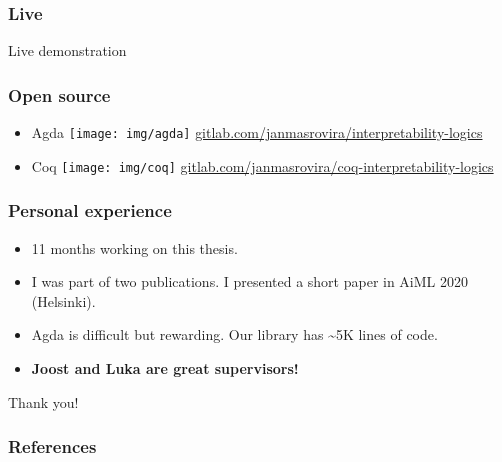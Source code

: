\documentclass[xcolor={x11names}]{beamer}
\newcommand{\agda}[0]{\texttt{[image: img/agda]}}
\newcommand{\coq}[0]{\texttt{[image: img/coq]}}
\begin{document}
\begin{frame}
  \frametitle{Live}
  \centering \Huge Live demonstration
\end{frame}


\begin{frame}
  \frametitle{Open source}
  \centering
  \begin{itemize}
  \item Agda \agda{}
    \href{https://gitlab.com/janmasrovira/interpretability-logics}{gitlab.com/janmasrovira/interpretability-logics}
    \break{} \\[1.1cm]
  \item Coq \coq{} \href{https://gitlab.com/janmasrovira/coq-interpretability-logics}{gitlab.com/janmasrovira/coq-interpretability-logics}
  \end{itemize}
\end{frame}

\begin{frame}
  \frametitle{Personal experience}
  \begin{itemize}
  \item 11 months working on this thesis. \break{} \pause{}
  \item I was part of two publications. I presented a short paper in AiML 2020
    (Helsinki). \break{} \pause{}
  \item Agda is difficult but rewarding. Our library has \textasciitilde{}5K
    lines of code. \break{} \pause{}

  \item \textbf{Joost and Luka are great supervisors!}
  \end{itemize}
\end{frame}


\begin{frame}
  \centering \Huge Thank you!
\end{frame}

\begin{frame}[allowframebreaks]
  \frametitle{References}
  \nocite{joosten2020overview}
  \nocite{Verbrugge}
  \printbibliography{}
\end{frame}
\end{document}
